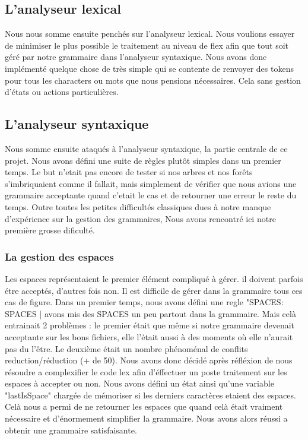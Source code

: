 \documentclass[12pt]{article}
\begin{document}
\subsection{L'analyseur lexical}

Nous nous somme ensuite penchés sur l'analyseur lexical. Nous voulions essayer de
minimiser le plus possible le traitement au niveau de flex afin que tout soit géré
par notre grammaire dans l'analyseur syntaxique. Nous avons donc implémenté
quelque chose de très simple qui se contente de renvoyer des tokens pour tous les
characters ou mots que nous pensions nécessaires. Cela sans gestion d'états ou actions
particulières.

\subsection{L'analyseur syntaxique}

Nous somme ensuite ataqués à l'analyseur syntaxique, la partie centrale de ce projet.
Nous avons défini une suite de règles plutôt simples dans un premier temps. Le but
n'etait pas encore de tester si nos arbres et nos forêts s'imbriquaient comme il fallait,
mais simplement de vérifier que nous avions une grammaire acceptante quand c'etait
le cas et de retourner une erreur le reste du temps.
\newline
Outre toutes les petites difficultés classiques dues à notre manque d'expérience
sur la gestion des grammaires, Nous avons rencontré ici notre première
grosse dificulté.

\subsubsection{La gestion des espaces}

Les espaces représentaient le premier élément compliqué à gérer. il doivent parfois étre acceptés,
d'autres fois non. Il est difficile de gérer dans la grammaire tous ces cas de figure.
Dans un premier temps, nous avons défini une regle "SPACES: SPACES | %
avons mis des SPACES un peu partout dans la grammaire. Mais celà entrainait 2 problèmes :
le premier était que même si notre grammaire devenait acceptante sur les bons fichiers, 
elle l'était aussi à des moments où elle n'aurait pas du l'être. Le deuxième était un
nombre phénoménal de conflits reduction/réduction (+ de 50).
\newline
Nous avons donc décidé après réfléxion de nous résoudre a complexifier le code lex
afin d'éffectuer un poste traitement sur les espaces à accepter ou non.
Nous avons défini un état ainsi qu'une variable "lastIsSpace" chargée de mémoriser
si les derniers caractères etaient des espaces. Celà nous a permi de ne retourner les
espaces que quand celà était vraiment nécessaire et d'énormement simplifier la grammaire.
Nous avons alors réussi a obtenir une grammaire satisfaisante.
\end{document}
